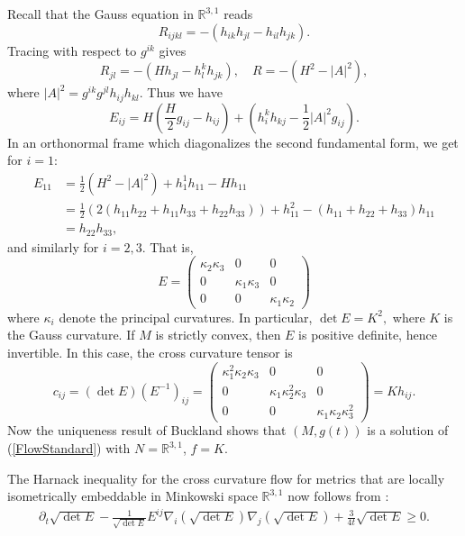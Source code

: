 Recall that the Gauss equation in $\mathbb{R}^{3,1}$ reads
\[
R_{ijkl} = -(h_{ik}h_{jl} - h_{il}h_{jk}).
\]
Tracing with respect to $g^{ik}$ gives
\[
R_{jl} = -(Hh_{jl} - h^k_lh_{jk}), \quad R = -(H^2 - |A|^2),
\]
where $|A|^2=g^{ik}g^{jl}h_{ij}h_{kl}.$
Thus we have
\[
E_{ij} = H\left(\frac{H}{2}g_{ij} - h_{ij}\right) + \left(h^k_ih_{kj} - \frac{1}{2}|A|^2g_{ij}\right).
\]
In an orthonormal frame which diagonalizes the second fundamental form, we get for $i=1$:
\[
\begin{split}
E_{11} &= \frac{1}{2}\left(H^2 - |A|^2\right) + h^1_1 h_{11} - Hh_{11} \\
&= \frac{1}{2}\left(2(h_{11}h_{22} + h_{11}h_{33} + h_{22}h_{33})\right) + h_{11}^2 - \left(h_{11} + h_{22} + h_{33}\right) h_{11} \\
&= h_{22}h_{33},
\end{split}
\]
and similarly for $i=2,3$. That is,
\[
E = \begin{pmatrix}
\kappa_2 \kappa_3 & 0 & 0 \\
0 & \kappa_1\kappa_3 & 0 \\
0 & 0 & \kappa_1\kappa_2
\end{pmatrix}
\]
where $\kappa_i$ denote the principal curvatures. In particular, $\det E = K^2,$ where $K$ is the Gauss curvature. If $M$ is strictly convex, then $E$ is positive definite, hence invertible. In this case, the cross curvature tensor is
\[
c_{ij} = ({\det} E) (E^{-1})_{ij} = \begin{pmatrix}
\kappa_1^2 \kappa_2 \kappa_3 & 0 & 0 \\
0 & \kappa_1\kappa_2^2 \kappa_3 & 0 \\
0 & 0 & \kappa_1\kappa_2\kappa_3^2
\end{pmatrix} = Kh_{ij}.
\]
Now the uniqueness result of Buckland \cite{Buckland:/2006} shows that $(M,g(t))$ is a solution of (\ref{FlowStandard}) with $N=\mathbb{R}^{3,1}$, $f=K$.

The Harnack inequality for the cross curvature flow for metrics that are locally isometrically embeddable in Minkowski space $\mathbb{R}^{3,1}$ now follows from :
\begin{align}\label{cross harnack}
\partial_t \sqrt{{\det} E} - \frac{1}{\sqrt{{\det}E}}E^{ij} \nabla_i \left(\sqrt{{\det}E}\right) \nabla_j \left(\sqrt{{\det}E}\right) + \frac{3}{4 t} \sqrt{{\det}E} \geq 0.
\end{align}








